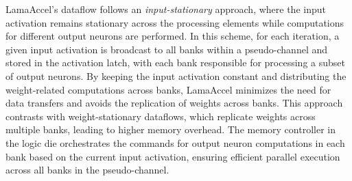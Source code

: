 
LamaAccel’s dataflow follows an \textit{input-stationary} approach, where the input activation remains stationary across the processing elements while computations for different output neurons are performed. In this scheme, for each iteration, a given input activation is broadcast to all banks within a pseudo-channel and stored in the activation latch, with each bank responsible for processing a subset of output neurons. By keeping the input activation constant and distributing the weight-related computations across banks, LamaAccel minimizes the need for data transfers and avoids the replication of weights across banks. This approach contrasts with weight-stationary dataflows, which replicate weights across multiple banks, leading to higher memory overhead. The memory controller in the logic die orchestrates the commands for output neuron computations in each bank based on the current input activation, ensuring efficient parallel execution across all banks in the pseudo-channel.



